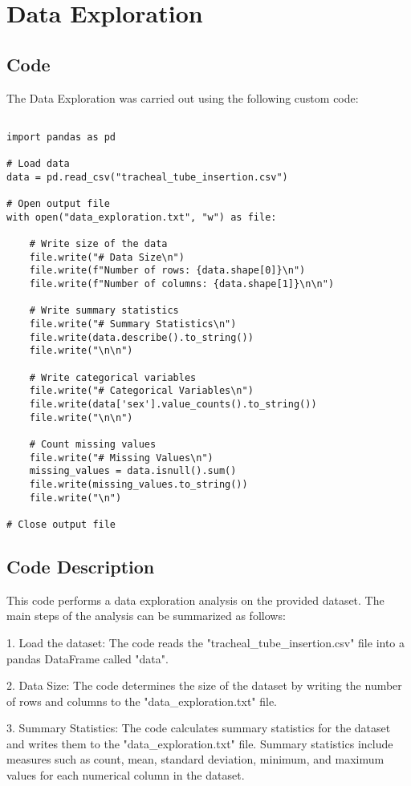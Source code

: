 \documentclass[11pt]{article}
\begin{document}
\section{Data Exploration}
\subsection{{Code}}
The Data Exploration was carried out using the following custom code:

\begin{verbatim}

import pandas as pd

# Load data
data = pd.read_csv("tracheal_tube_insertion.csv")

# Open output file
with open("data_exploration.txt", "w") as file:

    # Write size of the data
    file.write("# Data Size\n")
    file.write(f"Number of rows: {data.shape[0]}\n")
    file.write(f"Number of columns: {data.shape[1]}\n\n")

    # Write summary statistics
    file.write("# Summary Statistics\n")
    file.write(data.describe().to_string())
    file.write("\n\n")

    # Write categorical variables
    file.write("# Categorical Variables\n")
    file.write(data['sex'].value_counts().to_string())
    file.write("\n\n")

    # Count missing values
    file.write("# Missing Values\n")
    missing_values = data.isnull().sum()
    file.write(missing_values.to_string())
    file.write("\n")

# Close output file   

\end{verbatim}

\subsection{Code Description}

This code performs a data exploration analysis on the provided dataset. The main steps of the analysis can be summarized as follows:

1. Load the dataset: The code reads the "tracheal\_tube\_insertion.csv" file into a pandas DataFrame called "data".

2. Data Size: The code determines the size of the dataset by writing the number of rows and columns to the "data\_exploration.txt" file.

3. Summary Statistics: The code calculates summary statistics for the dataset and writes them to the "data\_exploration.txt" file. Summary statistics include measures such as count, mean, standard deviation, minimum, and maximum values for each numerical column in the dataset.
\end{document}
